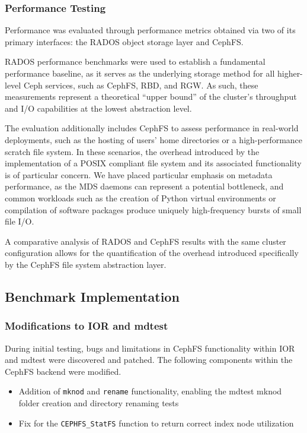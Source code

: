 \subsubsection{Performance Testing}

Performance was evaluated through performance metrics obtained via two of its primary interfaces: the \ac{RADOS} object storage layer and \ac{CephFS}.

\ac{RADOS} performance benchmarks were used to establish a fundamental performance baseline, as it serves as the underlying storage method for all higher-level Ceph services, such as \ac{CephFS}, \ac{RBD}, and \ac{RGW}. As such, these measurements represent a theoretical \enquote{upper bound} of the cluster's throughput and \ac{I/O} capabilities at the lowest abstraction level.

The evaluation additionally includes \ac{CephFS} to assess performance in real-world deployments, such as the hosting of users' home directories or a high-performance scratch file system. In these scenarios, the overhead introduced by the implementation of a \ac{POSIX} compliant file system and its associated functionality is of particular concern. We have placed particular emphasis on metadata performance, as the \ac{MDS} daemons can represent a potential bottleneck, and common workloads such as the creation of Python virtual environments or compilation of software packages produce uniquely high-frequency bursts of small file \ac{I/O}.

A comparative analysis of \ac{RADOS} and \ac{CephFS} results with the same cluster configuration allows for the quantification of the overhead introduced specifically by the \ac{CephFS} file system abstraction layer.

\subsection{Benchmark Implementation}

\subsubsection{Modifications to \acs{IOR} and mdtest}
\label{sec:modifications-to-ior-mdtest}

During initial testing, bugs and limitations in \ac{CephFS} functionality within \ac{IOR} and mdtest were discovered and patched. The following components within the \ac{CephFS} backend were modified.

\begin{itemize}
    \item Addition of \texttt{mknod} and \texttt{rename} functionality, enabling the mdtest mknod folder creation and directory renaming tests
    \item Fix for the \texttt{CEPHFS\_StatFS} function to return correct index node utilization
\end{itemize}

